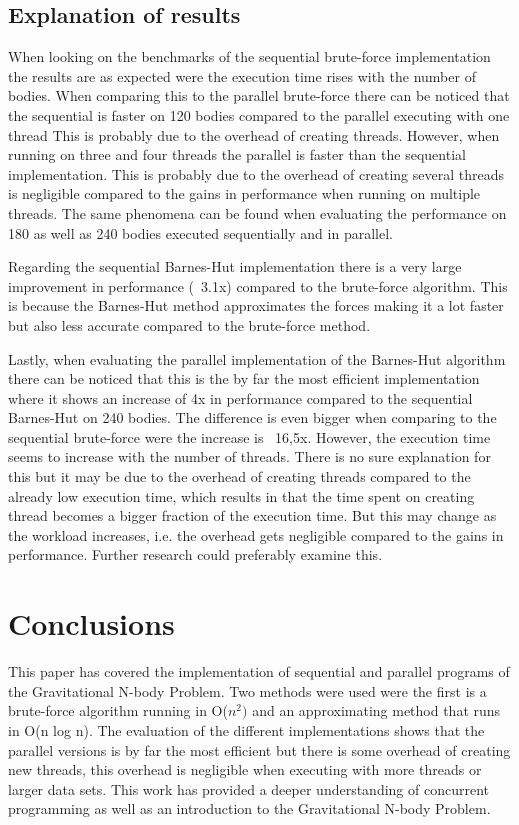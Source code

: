 \documentclass{article}
\begin{document}
\subsection{Explanation of results}
When looking on the benchmarks of the sequential brute-force implementation the results are as expected were the execution time rises with the number of bodies. When comparing this to the parallel brute-force there can be noticed that the sequential is faster on 120 bodies compared to the parallel executing with one thread This is probably due to the overhead of creating threads. However, when running on three and four threads the parallel is faster than the sequential implementation. This is probably due to the overhead of creating several threads is negligible compared to the gains in performance when running on multiple threads. The same phenomena can be found when evaluating the performance on 180 as well as 240 bodies executed sequentially and in parallel. 

Regarding the sequential Barnes-Hut implementation there is a very large improvement in performance (~3.1x) compared to the brute-force algorithm. This is because the Barnes-Hut method approximates the forces making it a lot faster but also less accurate compared to the brute-force method.   

Lastly, when evaluating the parallel implementation of the Barnes-Hut algorithm there can be noticed that this is the by far the most efficient implementation where it shows an increase of 4x in performance compared to the sequential Barnes-Hut on 240 bodies. The difference is even bigger when comparing to the sequential brute-force were the increase is ~16,5x. However, the execution time seems to increase with the number of threads. There is no sure explanation for this but it may be due to the overhead of creating threads compared to the already low execution time, which results in that the time spent on creating thread becomes a bigger fraction of the execution time. But this may change as the workload increases, i.e. the overhead gets negligible compared to the gains in performance. Further research could preferably examine this. 



\section{Conclusions}

This paper has covered the implementation of sequential and parallel programs of the Gravitational N-body Problem. Two methods were used were the first is a brute-force algorithm running in O(\(n^2)\) and an approximating method that runs in O(n log n). The evaluation of the different implementations shows that the parallel versions is by far the most efficient but there is some overhead of creating new threads, this overhead is negligible when executing with more threads or larger data sets. This work has provided a deeper understanding of concurrent programming as well as an introduction to the Gravitational N-body Problem. 
\end{document}
